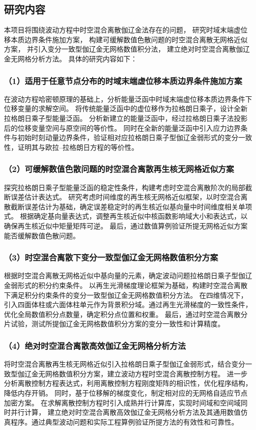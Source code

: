 \subsection{研究内容}
本项目将围绕波动方程中时空混合离散伽辽金法存在的问题，
研究时域末端虚位移本质边界条件施加方案，
构建可缓解数值色散问题的时空混合离散无网格近似方案，
并引入变分一致型伽辽金无网格数值积分法，
建立绝对时空混合离散伽辽金无网格分析方法。
具体的研究内容如下：

\subsubsection*{\bfseries （1）适用于任意节点分布的时域末端虚位移本质边界条件施加方案}
在波动方程哈密顿原理的基础上，分析能量泛函中时域末端虚位移本质边界条件下位移变量的求解空间。
将传统能量泛函中的虚位移作为拉格朗日乘子，设计全新拉格朗日乘子型能量泛函。
分析新建立的能量泛函中，经过拉格朗日乘子法投影后的位移变量空间与原空间的等价性。
同时在全新的能量泛函中引入应力边界条件与初始时刻动量边界条件，验证相对应拉格朗日乘子型伽辽金弱形式的变分一致性，证明其与欧拉--拉格朗日方程的等价性。


\subsubsection*{\bfseries （2）可缓解数值色散问题的时空混合离散再生核无网格近似方案}
探究拉格朗日乘子型能量泛函的稳定性条件，构建考虑时空混合离散阶次的局部截断误差估计表达式。
研究考虑时间维度的再生核无网格近似框架，以时空混合离散截断误差估计为基础，确定误差稳定时的再生核近似基向量中时间维度相关单项式。
根据确定基向量表达式，调整再生核近似中核函数影响域大小和表达式，以确保再生核近似中矩量矩阵可逆。
最后，通过数值算例验证所提无网格近似方案能否缓解数值色散问题。

\subsubsection*{\bfseries （3）时空混合离散下变分一致型伽辽金无网格数值积分方案}
根据时空混合离散无网格近似中基向量的元素，确定波动问题拉格朗日乘子型伽辽金弱形式的积分约束条件。
以再生光滑梯度理论框架为基础，构建时空混合离散下满足积分约束条件的变分一致型伽辽金无网格数值积分方法。
在四维情况下，引入四面体柱或六面体柱单元作为背景积分域。通过再生光滑梯度的一致性条件，优化全局数值积分点数量，确定积分点位置和权重。
最后，通过时空混合离散分片试验，测试所提伽辽金无网格数值积分方案的变分一致性和计算精度。

\subsubsection*{\bfseries （4）绝对时空混合离散高效伽辽金无网格分析方法}
将时空混合离散再生核无网格近似引入拉格朗日乘子型伽辽金弱形式，结合变分一致型伽辽金无网格数值积分方案，建立波动方程时空混合离散控制方程。
进一步分析离散控制方程表达式，利用离散控制方程刚度矩阵的相识性，优化程序结构，降低内存开销。
同时，基于位移解的梯度变化，制定相对应的无网格自适应节点加密方案。
在求解离散控制方程时引入成熟并行计算库，实现时间域和空间域同时并行计算，
建立绝对时空混合离散高效伽辽金无网格分析方法及其通用数值仿真程序。通过典型波动问题和实际工程算例验证所提方法的有效性和可靠性。

